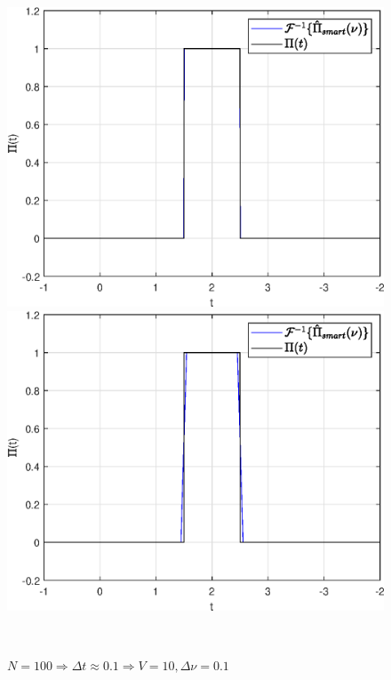 \documentclass[a4paper]{article}
\begin{document}
\begin{figure}[H]
    \begin{minipage}{0.5\textwidth}
        \centering \includegraphics[width=\textwidth]{graphs/3/T_10_dt_0.01001_V_100_dv_0.1/func_inversed_smart.eps}
        \caption{$N = 1000 \Rightarrow \Delta t \approx 0.01 \Rightarrow V = 100, \Delta \nu = 0.1$}
    \end{minipage}\hfill
    \begin{minipage}{0.5\textwidth}
        \centering \includegraphics[width=\textwidth]{graphs/3/T_10_dt_0.10101_V_10_dv_0.1/func_inversed_smart.eps}
        \caption{$N = 100 \Rightarrow \Delta t \approx 0.1 \Rightarrow V = 10, \Delta \nu = 0.1$}
    \end{minipage}\\[1em]
\end{figure}\noindent\
\end{document}
